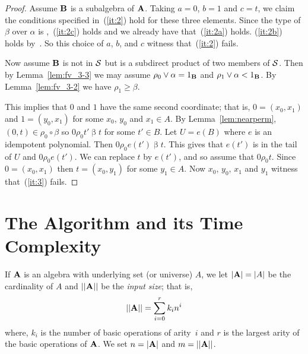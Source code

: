 \begin{proof}
Assume $\mathbf{B}$ is a subalgebra of $\mathbf{A}$. Taking
$a=0$, $b=1$ and $c=t$, we claim the conditions specified
in~(\ref{it:2}) hold for these three elements.
Since the type of $\beta$ over $\alpha$ is \atyp,~(\ref{it:2c})
holds and we already have that~(\ref{it:2a}) holds.
(\ref{it:2b}) holds by~\cite[Theorem~2.4]{KearnesKiss1999}.
So this choice of $a$, $b$, and $c$ witness that~(\ref{it:2}) fails.




Now assume $\mathbf{B}$ is not in $\mathcal{S}$ but is a subdirect
product of two members of $\mathcal{S}$.
Then
by Lemma~\ref{lem:fv_3-3} we may
assume $\rho_0 \join \alpha = 1_{\alg B}$ and
$\rho_1 \join \alpha < 1_{\alg B}$. By Lemma~\ref{lem:fv_3-2}
we have $\rho_1 \ge \beta$.

This implies that $0$ and $1$ have the same second coordinate; that is,
$0 = (x_0,x_1)$ and $1 = (y_0,x_1)$ for some $x_0$, $y_0$ and $x_1\in A$.
By Lemma~\ref{lem:nearperm}, $(0,t) \in \rho_0 \circ \beta$
so $0 \mathrel {\rho_0} t' \mathrel{\beta} t$ for some $t' \in B$. Let $U = e(B)$
where $e$ is an idempotent polynomial. Then
$0 \mathrel {\rho_0} e(t') \mathrel{\beta} t$. This gives
that $e(t')$ is in the tail of $U$ and
$0 \mathrel{\rho_0} e(t')$. We can
replace $t$ by $e(t')$, and so assume that
$0 \mathrel{\rho_0} t$.
Since $0 = (x_0,x_1)$ then $t = (x_0,y_1)$ for some $y_1\in A$.
Now
$x_0$, $y_0$, $x_1$ and $y_1$ witness that~(\ref{it:3}) fails.
\end{proof}



\section{The Algorithm and its Time Complexity}
\label{sec:algorithm-its-time}
If $\mathbf{A}$ is an algebra with underlying set (or universe) $A$,
we let $|\mathbf{A}| = |A|$ be the cardinality of
$A$ and $||\mathbf{A}||$ be the \emph{input size}; that is,
\[
||\mathbf{A}|| = \sum_{i=0}^r k_i n^i
\]
where, $k_i$ is the number of basic operations of arity~$i$ and $r$
is the largest arity of the basic operations of $\mathbf{A}$. We set
$n = |\mathbf{A}|$ and $m = ||\mathbf{A}||$.


